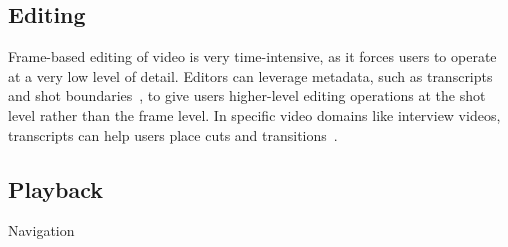 \subsection{Editing}
Frame-based editing of video is very time-intensive, as it forces users to operate at a very low level of detail. Editors can leverage metadata, such as transcripts~\cite{Berthouzoz:2012,Pavel:2014:VDB:2642918.2647400} and shot boundaries~\cite{Casares:2002dx}, to give users higher-level editing operations at the shot level rather than the frame level.
In specific video domains like interview videos, transcripts can help users place cuts and transitions~\cite{Berthouzoz:2012}.

\subsection{Playback}
Navigation


